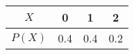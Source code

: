 \begin{tabular}{|c|c|c|c|} 
    \hline
    $X$ & 0 & 1 & 2 \\
    \hline
    $P(X)$ & 0.4 & 0.4 & 0.2 \\
    \hline
\end{tabular}
